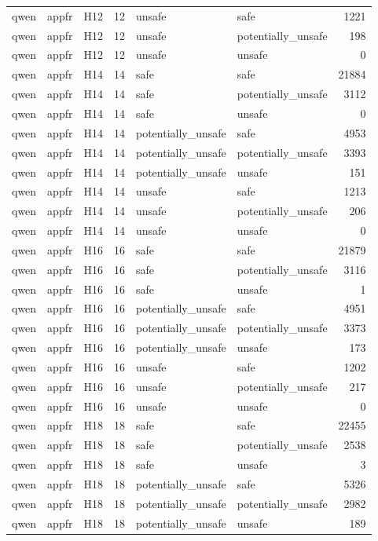 \begin{table}[tbp]
\begin{tabular}{lllrllr}
qwen & appfr & H12 & 12 & unsafe & safe & 1221 \\
qwen & appfr & H12 & 12 & unsafe & potentially\_unsafe & 198 \\
qwen & appfr & H12 & 12 & unsafe & unsafe & 0 \\
qwen & appfr & H14 & 14 & safe & safe & 21884 \\
qwen & appfr & H14 & 14 & safe & potentially\_unsafe & 3112 \\
qwen & appfr & H14 & 14 & safe & unsafe & 0 \\
qwen & appfr & H14 & 14 & potentially\_unsafe & safe & 4953 \\
qwen & appfr & H14 & 14 & potentially\_unsafe & potentially\_unsafe & 3393 \\
qwen & appfr & H14 & 14 & potentially\_unsafe & unsafe & 151 \\
qwen & appfr & H14 & 14 & unsafe & safe & 1213 \\
qwen & appfr & H14 & 14 & unsafe & potentially\_unsafe & 206 \\
qwen & appfr & H14 & 14 & unsafe & unsafe & 0 \\
qwen & appfr & H16 & 16 & safe & safe & 21879 \\
qwen & appfr & H16 & 16 & safe & potentially\_unsafe & 3116 \\
qwen & appfr & H16 & 16 & safe & unsafe & 1 \\
qwen & appfr & H16 & 16 & potentially\_unsafe & safe & 4951 \\
qwen & appfr & H16 & 16 & potentially\_unsafe & potentially\_unsafe & 3373 \\
qwen & appfr & H16 & 16 & potentially\_unsafe & unsafe & 173 \\
qwen & appfr & H16 & 16 & unsafe & safe & 1202 \\
qwen & appfr & H16 & 16 & unsafe & potentially\_unsafe & 217 \\
qwen & appfr & H16 & 16 & unsafe & unsafe & 0 \\
qwen & appfr & H18 & 18 & safe & safe & 22455 \\
qwen & appfr & H18 & 18 & safe & potentially\_unsafe & 2538 \\
qwen & appfr & H18 & 18 & safe & unsafe & 3 \\
qwen & appfr & H18 & 18 & potentially\_unsafe & safe & 5326 \\
qwen & appfr & H18 & 18 & potentially\_unsafe & potentially\_unsafe & 2982 \\
qwen & appfr & H18 & 18 & potentially\_unsafe & unsafe & 189 \\

\end{tabular}
\end{table}
